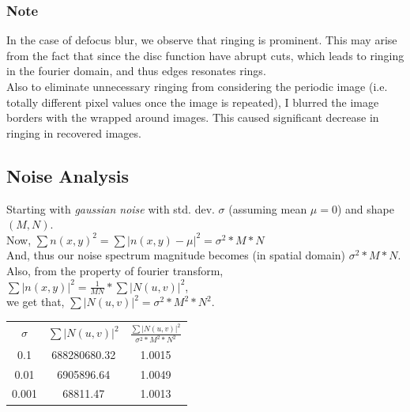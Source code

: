 \documentclass{article}
\begin{document}
    \subsubsection*{Note}
    In the case of defocus blur, we observe that ringing is prominent. This may arise from the fact that since the disc function have abrupt cuts, which leads to ringing in the fourier domain, and thus edges resonates rings.\\
    Also to eliminate unnecessary ringing from considering the periodic image (i.e. totally different pixel values once the image is repeated), I blurred the image borders with the wrapped around images. This caused significant decrease in ringing in recovered images.
    \pagebreak

    \subsection*{Noise Analysis}
    Starting with \textit{gaussian noise} with std. dev. \(\sigma\) (assuming mean \(\mu = 0\)) and shape \((M,N)\). \\
    Now, \(\sum n(x, y)^2 = \sum |n(x, y) - \mu|^2 = \sigma^2 * M * N\) \\
    And, thus our noise spectrum magnitude becomes (in spatial domain) \(\sigma^2 * M * N\).\\
    Also, from the property of fourier transform, \(\sum |n(x, y)|^2 = \frac{1}{MN}*\sum |N(u,v)|^2\), \\
    we get that, \(\sum |N(u, v)|^2 = \sigma^2 * M^2 * N^2\). \\
    
    \begin{table}[]
    \centering
    \begin{tabular}{c|c|c}
    \(\sigma\) & \(\sum |N(u, v)|^2\) & {\(\frac{\sum |N(u, v)|^2}{\sigma^2 * M^2 * N^2}\)} \\
        0.1 & 688280680.32 &{1.0015} \\
        0.01 & 6905896.64 &{1.0049} \\
        0.001 & 68811.47 &{1.0013}
    \end{tabular}
    \end{table}

\end{document}
